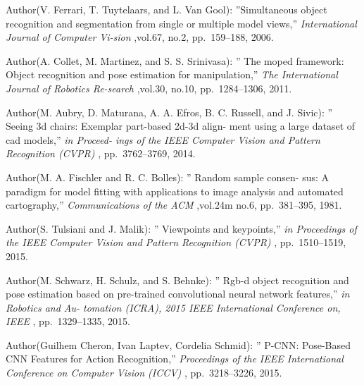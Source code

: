 

\begin{thebibliography}{9}				%

	Author(V. Ferrari, T. Tuytelaars, and L. Van Gool):
		''Simultaneous object recognition and segmentation from single or multiple model views,''
		{\it International Journal of Computer Vi-sion}
		,vol.67, no.2, pp.~159--188, 2006.

	Author(A. Collet, M. Martinez, and S. S. Srinivasa):
		'' The moped framework: Object recognition and pose estimation for manipulation,''
		{\it The International Journal of Robotics Re-search }
		,vol.30, no.10, pp.~1284--1306, 2011.

	Author(M. Aubry, D. Maturana, A. A. Efros, B. C. Russell, and J. Sivic):
		'' Seeing 3d chairs: Exemplar part-based 2d-3d align- ment using a large dataset of cad models,''
		{\it  in Proceed- ings of the IEEE Computer Vision and Pattern Recognition (CVPR)}
		, pp.~3762--3769, 2014.

	Author(M. A. Fischler and R. C. Bolles):
		'' Random sample consen- sus: A paradigm for model fitting with applications to image analysis and automated cartography,''
		{\it Communications of the ACM}
		,vol.24m no.6, pp.~381--395, 1981.

	Author(S. Tulsiani and J. Malik):
		'' Viewpoints and keypoints,''
		{\it in Proceedings of the IEEE Computer Vision and Pattern Recognition (CVPR)}
		, pp.~1510--1519, 2015.

	Author(M. Schwarz, H. Schulz, and S. Behnke):
		'' Rgb-d object recognition and pose estimation based on pre-trained convolutional neural network features,''
		{\it  in Robotics and Au- tomation (ICRA), 2015 IEEE International Conference on, IEEE}
		, pp.~1329--1335, 2015.
	

	Author(Guilhem Cheron, Ivan Laptev, Cordelia Schmid):
		'' P-CNN: Pose-Based CNN Features for Action Recognition,''
		{\it Proceedings of the IEEE International Conference on Computer Vision (ICCV)}
		, pp.~3218--3226, 2015.


\end{thebibliography}
